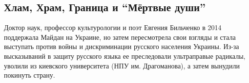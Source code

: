  
 
 
 
 
\subsection{Хлам, Храм, Граница и \enquote{Мёртвые души}}
\label{sec:24_11_2021.stz.news.ru.lesmedia.1.bilchenko}


Доктор наук, профессор культурологии и поэт Евгения Бильченко в 2014 поддержала
Майдан на Украине, но затем пересмотрела свои взгляды и стала выступать против
войны и дискриминации русского населения Украины. Из-за высказываний в защиту
русского языка ее преследовали ультраправые радикалы, уволили из киевского
университета (НПУ им. Драгоманова), а затем вынудили покинуть страну. 
